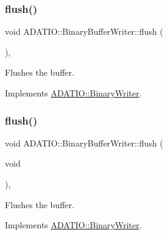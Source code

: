 \subsubsection{\texorpdfstring{flush()}{flush()}\hspace{0.1cm}{\footnotesize\ttfamily [1/2]}}
{\footnotesize\ttfamily void A\+D\+A\+T\+I\+O\+::\+Binary\+Buffer\+Writer\+::flush (\begin{DoxyParamCaption}{ }\end{DoxyParamCaption})\hspace{0.3cm}{\ttfamily [inline]}, {\ttfamily [virtual]}}



Flushes the buffer. 



Implements \mbox{\hyperlink{classADATIO_1_1BinaryWriter_a1d335eeed64094b8641f3ebf731c981e}{A\+D\+A\+T\+I\+O\+::\+Binary\+Writer}}.

\mbox{\label{classADATIO_1_1BinaryBufferWriter_accc3319508a804b054d21b6bddeef85d}} 
\subsubsection{\texorpdfstring{flush()}{flush()}\hspace{0.1cm}{\footnotesize\ttfamily [2/2]}}
{\footnotesize\ttfamily void A\+D\+A\+T\+I\+O\+::\+Binary\+Buffer\+Writer\+::flush (\begin{DoxyParamCaption}\item[{void}]{ }\end{DoxyParamCaption})\hspace{0.3cm}{\ttfamily [inline]}, {\ttfamily [virtual]}}



Flushes the buffer. 



Implements \mbox{\hyperlink{classADATIO_1_1BinaryWriter_a1d335eeed64094b8641f3ebf731c981e}{A\+D\+A\+T\+I\+O\+::\+Binary\+Writer}}.

\mbox{\label{classADATIO_1_1BinaryBufferWriter_a3d7ec1583f03981f0a84571646be46f3}} 
